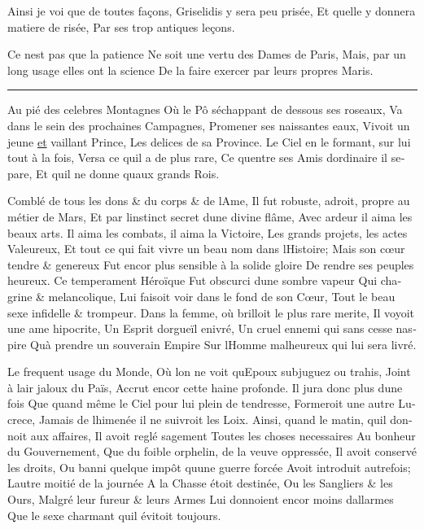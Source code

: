 \documentclass[14pt,a4paper]{memoir}
\newcommand{\ul}[1]{\uline{#1}}
\begin{document}
\begin{otherlanguage}{french}
{Ainsi je voi que de toutes façons,} {Griselidis y sera peu prisée,} {Et
qu\textquotesingle elle y donnera matiere de risée,} {Par ses trop
antiques leçons.}

{ Ce n\textquotesingle est pas que la patience} {Ne soit une vertu des
Dames de Paris,} {Mais, par un long usage elles ont la science} {De la
faire exercer par leurs propres Maris.}

\begin{center}\rule{0.5\linewidth}{0.5pt}\end{center}

{Au pié des celebres Montagnes} {Où le Pô s\textquotesingle échappant de
dessous ses roseaux,} {Va dans le sein des prochaines Campagnes,}
{Promener ses naissantes eaux,} {Vivoit un jeune \ul{et} vaillant
Prince,} {Les delices de sa Province.} {Le Ciel en le formant, sur lui
tout à la fois,} {Versa ce qu\textquotesingle il a de plus rare,} {Ce
qu\textquotesingle entre ses Amis d\textquotesingle ordinaire il
separe,} {Et qu\textquotesingle il ne donne qu\textquotesingle aux
grands Rois.}

{Comblé de tous les dons \& du corps \& de l\textquotesingle Ame,} {Il
fut robuste, adroit, propre au métier de Mars, } {Et par
l\textquotesingle instinct secret d\textquotesingle une divine flâme,}
{Avec ardeur il aima les beaux arts.} {Il aima les combats, il aima la
Victoire,} {Les grands projets, les actes Valeureux,} {Et tout ce qui
fait vivre un beau nom dans l\textquotesingle Histoire;} {Mais son cœur
tendre \& genereux} {Fut encor plus sensible à la solide gloire} {De
rendre ses peuples heureux.} {Ce temperament Héroïque} {Fut obscurci
d\textquotesingle une sombre vapeur} {Qui chagrine \& melancolique,}
{Lui faisoit voir dans le fond de son Cœur, } {Tout le beau sexe
infidelle \& trompeur.} {Dans la femme, où brilloit le plus rare merite,
} {Il voyoit une ame hipocrite,} {Un Esprit d\textquotesingle orgueïl
enivré,} {Un cruel ennemi qui sans cesse n\textquotesingle aspire}
{Qu\textquotesingle à prendre un souverain Empire} {Sur
l\textquotesingle Homme malheureux qui lui sera livré.}

{Le frequent usage du Monde,} {Où l\textquotesingle on ne voit
qu\textquotesingle Epoux subjuguez ou trahis,} {Joint à
l\textquotesingle air jaloux du Païs,} {Accrut encor cette haine
profonde.} {Il jura donc plus d\textquotesingle une fois} {Que quand
même le Ciel pour lui plein de tendresse,} {Formeroit une autre
Lucrece,} {Jamais de l\textquotesingle himenée il ne suivroit les Loix.}
{Ainsi, quand le matin, qu\textquotesingle il donnoit aux affaires,} {Il
avoit reglé sagement} {Toutes les choses necessaires} {Au bonheur du
Gouvernement,} {Que du foible orphelin, de la veuve oppressée,} {Il
avoit conservé les droits,} {Ou banni quelque impôt
qu\textquotesingle une guerre forcée} {Avoit introduit autrefois;}
{L\textquotesingle autre moitié de la journée} {A la Chasse étoit
destinée,} {Ou les Sangliers \& les Ours,} {Malgré leur fureur \& leurs
Armes} {Lui donnoient encor moins d\textquotesingle allarmes} {Que le
sexe charmant qu\textquotesingle il évitoit toujours.}


\end{otherlanguage}
\end{document}
